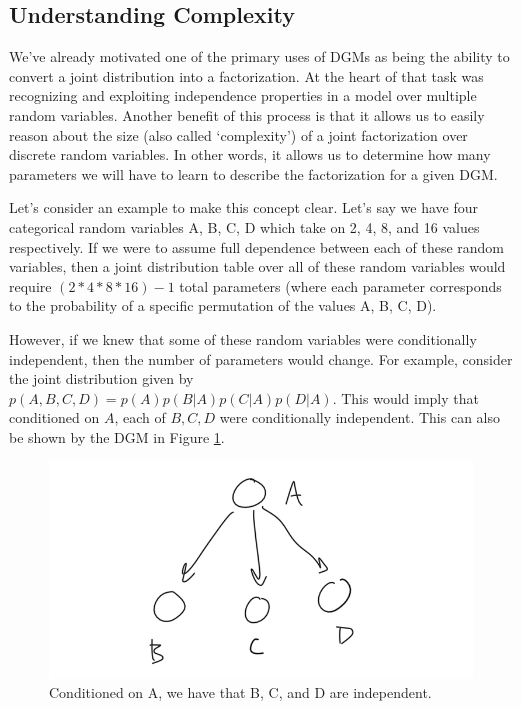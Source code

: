 \subsection{Understanding Complexity}
We've already motivated one of the primary uses of DGMs as being the ability to convert a joint distribution into a factorization. At the heart of that task was recognizing and exploiting independence properties in a model over multiple random variables. Another benefit of this process is that it allows us to easily reason about the size (also called `complexity') of a joint factorization over discrete random variables. In other words, it allows us to determine how many parameters we will have to learn to describe the factorization for a given DGM.

Let's consider an example to make this concept clear. Let's say we have four categorical random variables A, B, C, D which take on 2, 4, 8, and 16 values respectively. If we were to assume full dependence between each of these random variables, then a joint distribution table over all of these random variables would require $(2 * 4 * 8 * 16) - 1$ total parameters (where each parameter corresponds to the probability of a specific permutation of the values A, B, C, D).


However, if we knew that some of these random variables were conditionally independent, then the number of parameters would change. For example, consider the joint distribution given by $p(A, B, C, D) = p(A)p(B|A)p(C|A)p(D|A)$. This would imply that conditioned on $A$, each of $B, C, D$ were conditionally independent. This can also be shown by the DGM in Figure \ref{fig:complexity-dgm}.
\begin{figure}
	\centering
	\includegraphics[width=0.5\paperwidth]{../GraphicalModels/fig/complexity-dgm.png}
    \caption{Conditioned on A, we have that B, C, and D are independent.}
	\label{fig:complexity-dgm}
\end{figure}

